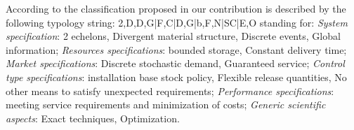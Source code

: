 \documentclass[preprint,11pt,authoryear]{elsarticle}
\begin{document}
According to the classification proposed in \cite{DEKOK2018} our contribution is described by the following typology string: 2,D,D,G|F,C|D,G|b,F,N|SC|E,O
standing for: {\it System specification}: 2 echelons, Divergent material structure, Discrete events, Global information; {\it Resources specifications}: bounded storage, Constant delivery time; {\it Market specifications}: Discrete stochastic demand, Guaranteed service; {\it Control type specifications}: installation base stock policy, Flexible release quantities, No other means to satisfy unexpected requirements; {\it Performance specifications}: meeting service requirements and minimization of costs; {\it Generic scientific aspects}: Exact techniques, Optimization.




\end{document}
